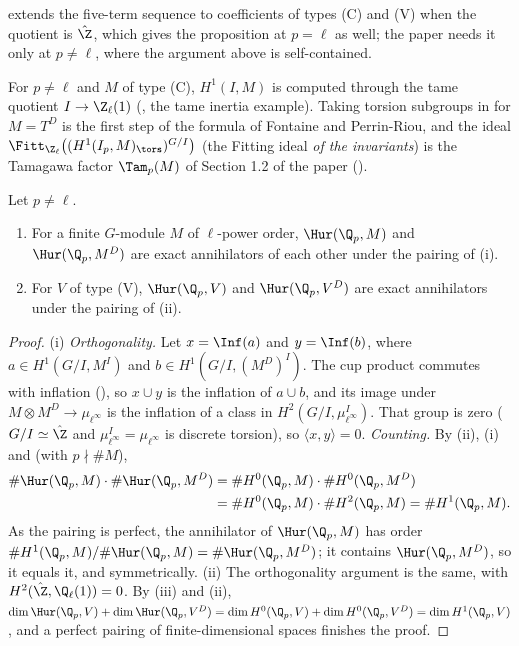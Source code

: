 \noindent {} extends the five-term sequence to coefficients of types (C) and (V) when the quotient is $\hat\Z$, which gives the proposition at $p=\ell$ as
well; the paper needs it only at $p\ne\ell$, where the argument above is self-contained.

\begin{remark}\label{rem:galcoh:tamagawa-preview}
For $p\ne\ell$ and $M$ of type (C), $H^1(I,M)$ is computed through the tame quotient $I\to\Z_\ell(1)$ (, the tame inertia example). Taking torsion
subgroups in  for $M=T^D$ is the first step of the formula of Fontaine and Perrin-Riou, and the ideal
$\Fitt_{\Z_\ell}\bigl((H^1(I_p,M)_{\tors})^{G/I}\bigr)$ (the Fitting ideal \emph{of the invariants}) is the Tamagawa factor $\Tam_p(M)$ of Section 1.2 of the paper
().
\end{remark}

\begin{theorem}\label{thm:galcoh:ur-orthogonal}
Let $p\ne\ell$.
\begin{enumerate}[label=(\roman*)]
\item For a finite $G$-module $M$ of $\ell$-power order, $\Hur(\Q_p,M)$ and $\Hur(\Q_p,M^D)$ are exact annihilators of each other under the pairing of
(i).
\item For $V$ of type (V), $\Hur(\Q_p,V)$ and $\Hur(\Q_p,V^D)$ are exact annihilators under the pairing of (ii).
\end{enumerate}
\end{theorem}

\begin{proof}
(i) \emph{Orthogonality.} Let $x=\Inf(a)$ and $y=\Inf(b)$, where $a\in H^1(G/I,M^I)$ and $b\in H^1(G/I,(M^D)^I)$. The cup product commutes with inflation
(), so $x\cup y$ is the inflation of $a\cup b$, and its image under $M\otimes M^D\to\mu_{\ell^\infty}$ is the inflation of a class in
$H^2(G/I,\mu_{\ell^\infty}^I)$. That group is zero ($G/I\simeq\hat\Z$ and $\mu_{\ell^\infty}^I=\mu_{\ell^\infty}$ is discrete torsion), so $\langle x,y\rangle=0$.
\emph{Counting.} By (ii), (i) and  (with $p\nmid\#M$),
\begin{align*}
\#\Hur(\Q_p,M)\cdot\#\Hur(\Q_p,M^D)&=\#H^0(\Q_p,M)\cdot\#H^0(\Q_p,M^D)\\
&=\#H^0(\Q_p,M)\cdot\#H^2(\Q_p,M)=\#H^1(\Q_p,M).
\end{align*}
As the pairing is perfect, the annihilator of $\Hur(\Q_p,M)$ has order $\#H^1(\Q_p,M)/\#\Hur(\Q_p,M)=\#\Hur(\Q_p,M^D)$; it contains $\Hur(\Q_p,M^D)$, so it equals it, and
symmetrically.
(ii) The orthogonality argument is the same, with $H^2(\hat\Z,\Q_\ell(1))=0$. By (iii) and
(ii), $\dim\Hur(\Q_p,V)+\dim\Hur(\Q_p,V^D)=\dim H^0(\Q_p,V)+\dim H^0(\Q_p,V^D)=\dim H^1(\Q_p,V)$, and a perfect pairing of
finite-dimensional spaces finishes the proof.
\end{proof}

